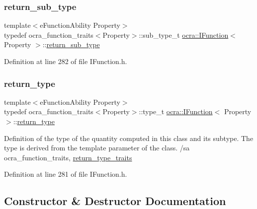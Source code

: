 \subsubsection{\texorpdfstring{return\+\_\+sub\+\_\+type}{return\_sub\_type}}
{\footnotesize\ttfamily template$<$e\+Function\+Ability Property$>$ \\
typedef ocra\+\_\+function\+\_\+traits$<$Property$>$\+::sub\+\_\+type\+\_\+t \hyperlink{classocra_1_1IFunction}{ocra\+::\+I\+Function}$<$ Property $>$\+::\hyperlink{classocra_1_1IFunction_ac6604adbd04613e1f545fb522cedbe3d}{return\+\_\+sub\+\_\+type}}



Definition at line 282 of file I\+Function.\+h.

\hypertarget{classocra_1_1IFunction_a04d351c2f938d01046328b54fb7e6525}{}\label{classocra_1_1IFunction_a04d351c2f938d01046328b54fb7e6525} 
\subsubsection{\texorpdfstring{return\+\_\+type}{return\_type}}
{\footnotesize\ttfamily template$<$e\+Function\+Ability Property$>$ \\
typedef ocra\+\_\+function\+\_\+traits$<$Property$>$\+::type\+\_\+t \hyperlink{classocra_1_1IFunction}{ocra\+::\+I\+Function}$<$ Property $>$\+::\hyperlink{classocra_1_1IFunction_a04d351c2f938d01046328b54fb7e6525}{return\+\_\+type}}

Definition of the type of the quantity computed in this class and its subtype. The type is derived from the template parameter of the class. /sa ocra\+\_\+function\+\_\+traits, \hyperlink{structocra_1_1return__type__traits}{return\+\_\+type\+\_\+traits} 

Definition at line 281 of file I\+Function.\+h.



\subsection{Constructor \& Destructor Documentation}
\hypertarget{classocra_1_1IFunction_a6aa2340376a035f9b80c747b09e701fa}{}\label{classocra_1_1IFunction_a6aa2340376a035f9b80c747b09e701fa} 
